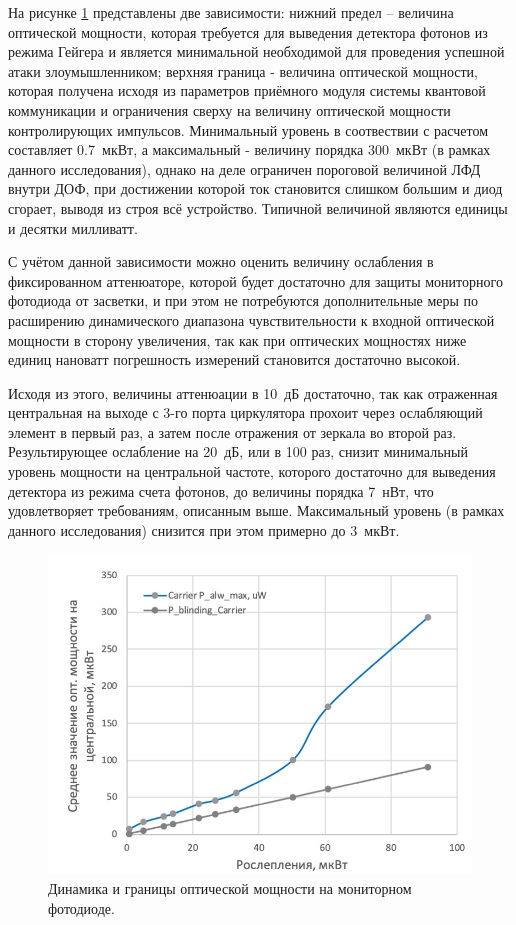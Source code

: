  На рисунке \ref{fig:Watchdog_photodiode} представлены две зависимости: нижний предел -- величина оптической мощности, которая требуется для выведения детектора фотонов из режима Гейгера и является минимальной необходимой для проведения успешной атаки злоумышленником; верхняя граница - величина оптической мощности, которая получена исходя из параметров приёмного модуля системы квантовой коммуникации и ограничения сверху на величину оптической мощности контролирующих импульсов. Минимальный уровень в соотвествии с расчетом составляет 0.7~мкВт, а максимальный - величину порядка 300~мкВт (в рамках данного исследования), однако на деле ограничен пороговой величиной ЛФД внутри ДОФ, при достижении которой ток становится слишком большим и диод сгорает, выводя из строя всё устройство. Типичной величиной являются единицы и десятки милливатт. 


С учётом данной зависимости можно оценить величину ослабления в фиксированном аттенюаторе, которой будет достаточно для защиты мониторного фотодиода от засветки, и при этом не потребуются дополнительные меры по расширению динамического диапазона чувствительности к входной оптической мощности в сторону увеличения, так как при оптических мощностях ниже единиц нановатт погрешность измерений становится достаточно высокой.   

Исходя из этого, величины аттенюации в 10~дБ достаточно, так как отраженная центральная на выходе с 3-го порта циркулятора прохоит через ослабляющий элемент в первый раз, а затем после отражения от зеркала во второй раз. Результирующее ослабление на 20~дБ, или в 100 раз, снизит минимальный уровень мощности на центральной частоте, которого достаточно для выведения детектора из режима счета фотонов, до величины порядка 7~нВт, что удовлетворяет требованиям, описанным выше. Максимальный уровень (в рамках данного исследования) снизится при этом примерно до 3~мкВт. 


 \begin{figure}[ht]
  \centering
  \includegraphics[scale=0.5]{images/Watchdog_photodiode.png}
  \caption{Динамика и границы оптической мощности на мониторном фотодиоде.}
  \label{fig:Watchdog_photodiode}
\end{figure}



